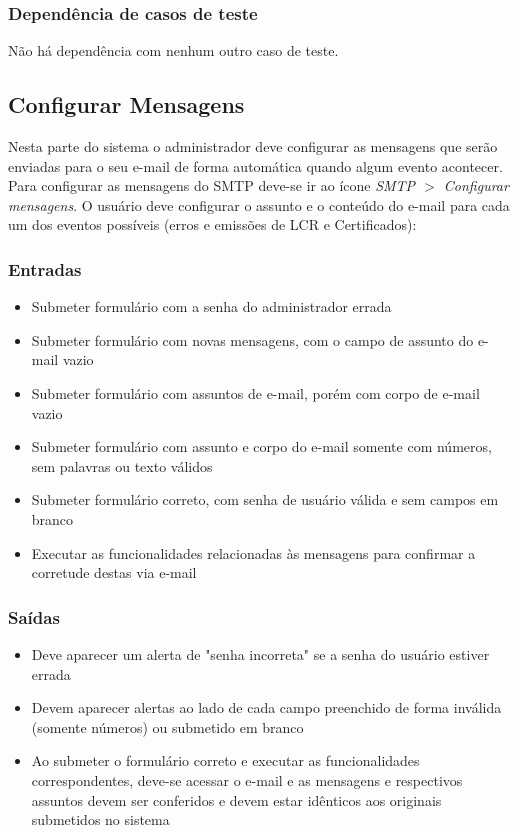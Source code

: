 \subsubsection{Dependência de casos de teste}
Não há dependência com nenhum outro caso de teste.

\subsection{Configurar Mensagens}

Nesta parte do sistema o administrador deve configurar as mensagens que serão enviadas para o seu e-mail de forma automática quando algum evento acontecer. Para configurar as mensagens do SMTP deve-se ir ao ícone \textit{SMTP $>$ Configurar mensagens}. O usuário deve configurar o assunto e o conteúdo do e-mail para cada um dos eventos possíveis (erros e emissões de LCR e Certificados):

\subsubsection{Entradas}
\begin{itemize}
	\item Submeter formulário com a senha do administrador errada
	\item Submeter formulário com novas mensagens, com o campo de assunto do e-mail vazio
	\item Submeter formulário com assuntos de e-mail, porém com corpo de e-mail vazio
	\item Submeter formulário com assunto e corpo do e-mail somente com números, sem palavras ou texto válidos
	\item Submeter formulário correto, com senha de usuário válida e sem campos em branco
	\item Executar as funcionalidades relacionadas às mensagens para confirmar a corretude destas via e-mail
\end{itemize}

\subsubsection{Saídas}
\begin{itemize}
    \item Deve aparecer um alerta de "senha incorreta" se a senha do usuário estiver errada
    \item Devem aparecer alertas ao lado de cada campo preenchido de forma inválida (somente números) ou submetido em branco
	\item Ao submeter o formulário correto e executar as funcionalidades correspondentes, deve-se acessar o e-mail e as mensagens e respectivos assuntos devem ser conferidos e devem estar idênticos aos originais submetidos no sistema
\end{itemize}

